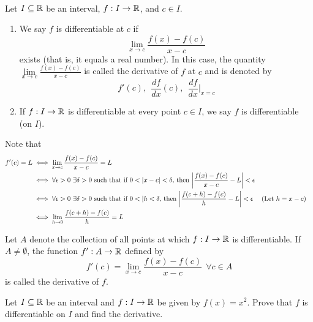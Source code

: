 \begin{definition}  \leavevmode \\
    Let $I \subseteq \mathbb{R}$ be an interval, $f: I \to \mathbb{R}$, and $c \in I.$
    \begin{enumerate}[$(i)$]
        \item We say $f$ is differentiable at $c$ if
        $$\lim \limits_{x \to c} \frac{f(x) - f(c)}{x - c}$$
        exists (that is, it equals a real number). In this case, the quantity $\lim \limits_{x \to c} \frac{f(x) - f(c)}{x - c}$ is called the derivative of $f$ at $c$ and is denoted by
        $$f'(c), ~~\frac{df}{dx}(c), ~~\frac{df}{dx}|_{x=c}$$

        \item If $f: I \to \mathbb{R}$ is differentiable at every point $c\in I$, we say $f$ is differentiable (on $I$).
    \end{enumerate}
\end{definition}

\begin{remark}
    Note that
    \begin{align*}
        f'(c) = L &\iff \lim \limits_{x \to c} \frac{f(x) - f(c)}{x - c} = L \\
        &\iff \forall \epsilon > 0 ~\exists \delta > 0 \text{ such that } \text{if $0 < |x-c|<\delta$, then $\left|\frac{f(x) - f(c)}{x-c} - L\right| < \epsilon$} \\
        &\iff \forall \epsilon > 0 ~\exists \delta > 0 \text{ such that } \text{if $0 < |h<\delta$, then $\left|\frac{f(c+h) - f(c)}{h} - L\right| < \epsilon$} &&(\text{Let $h = x - c$}) \\
        &\iff \lim \limits_{h \to 0} \frac{f(c+h)-f(c)}{h} = L
    \end{align*}
\end{remark}

\begin{remark}
    Let $A$ denote the collection of all points at which $f: I \to \mathbb{R}$ is differentiable. If $A \not = \emptyset$, the function $f':A \to \mathbb{R}$ defined by
    $$f'(c) = \lim \limits_{x \to c}\frac{f(x) - f(c)}{x-c} ~~\forall c \in A$$
    is called the derivative of $f$.
\end{remark}

\begin{example}
    Let $I\subseteq \mathbb{R}$ be an interval and $f: I \to \mathbb{R}$ be given by $f(x) = x^2$. Prove that $f$ is differentiable on $I$ and find the derivative.
\end{example}


